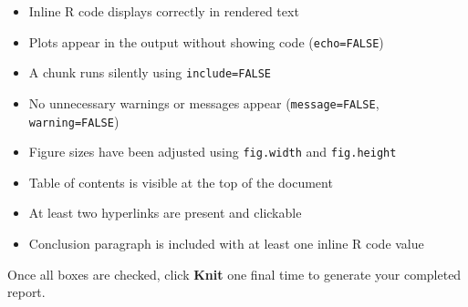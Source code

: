 \documentclass[
]{article}
\providecommand{\tightlist}{%
  \setlength{\itemsep}{0pt}\setlength{\parskip}{0pt}}
\begin{document}
\begin{itemize}
\tightlist
\item[$\square$]
  Inline R code displays correctly in rendered text
\item[$\square$]
  Plots appear in the output without showing code (\texttt{echo=FALSE})
\item[$\square$]
  A chunk runs silently using \texttt{include=FALSE}
\item[$\square$]
  No unnecessary warnings or messages appear (\texttt{message=FALSE},
  \texttt{warning=FALSE})
\item[$\square$]
  Figure sizes have been adjusted using \texttt{fig.width} and
  \texttt{fig.height}
\item[$\square$]
  Table of contents is visible at the top of the document
\item[$\square$]
  At least two hyperlinks are present and clickable
\item[$\square$]
  Conclusion paragraph is included with at least one inline R code value
\end{itemize}

Once all boxes are checked, click \textbf{Knit} one final time to
generate your completed report.
\end{document}
